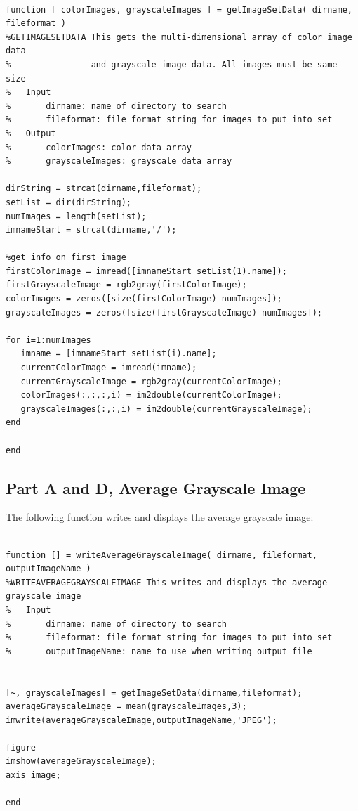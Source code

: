\documentclass[11pt,psfig]{article}
\begin{document}
\begin{verbatim}

function [ colorImages, grayscaleImages ] = getImageSetData( dirname, fileformat )
%GETIMAGESETDATA This gets the multi-dimensional array of color image data
%                and grayscale image data. All images must be same size
%   Input
%       dirname: name of directory to search
%       fileformat: file format string for images to put into set
%   Output
%       colorImages: color data array
%       grayscaleImages: grayscale data array

dirString = strcat(dirname,fileformat);
setList = dir(dirString);
numImages = length(setList);
imnameStart = strcat(dirname,'/');

%get info on first image
firstColorImage = imread([imnameStart setList(1).name]);
firstGrayscaleImage = rgb2gray(firstColorImage);
colorImages = zeros([size(firstColorImage) numImages]);
grayscaleImages = zeros([size(firstGrayscaleImage) numImages]);

for i=1:numImages
   imname = [imnameStart setList(i).name];
   currentColorImage = imread(imname);
   currentGrayscaleImage = rgb2gray(currentColorImage);
   colorImages(:,:,:,i) = im2double(currentColorImage);
   grayscaleImages(:,:,i) = im2double(currentGrayscaleImage);
end

end

\end{verbatim}

\subsection*{Part A and D, Average Grayscale Image}

The following function writes and displays the average grayscale image:

\begin{verbatim}

function [] = writeAverageGrayscaleImage( dirname, fileformat, outputImageName )
%WRITEAVERAGEGRAYSCALEIMAGE This writes and displays the average grayscale image
%   Input
%       dirname: name of directory to search
%       fileformat: file format string for images to put into set
%       outputImageName: name to use when writing output file


[~, grayscaleImages] = getImageSetData(dirname,fileformat);
averageGrayscaleImage = mean(grayscaleImages,3);
imwrite(averageGrayscaleImage,outputImageName,'JPEG');

figure
imshow(averageGrayscaleImage);
axis image;

end

\end{verbatim}
\end{document}
